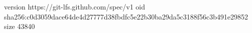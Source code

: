 version https://git-lfs.github.com/spec/v1
oid sha256:c0d3059dace64de4d27777d38fbdfc5e22b30ba29da5c3188f56c3b491e29852
size 43840
